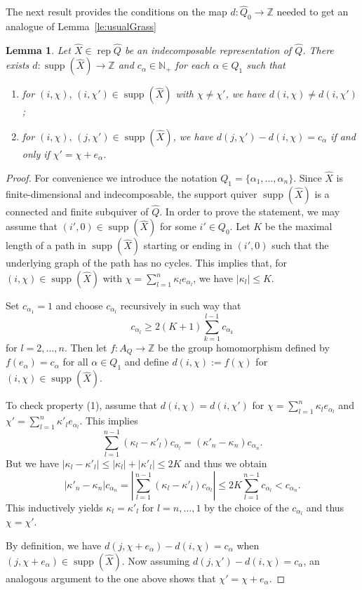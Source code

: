 \documentclass{amsart}
\newtheorem{lemma}[theorem]{Lemma}
\numberwithin{equation}{section}
\newcommand{\ZZ}{\mathbb{Z}}
\newcommand{\rep}{\operatorname{rep}}
\newcommand{\supp}{\operatorname{supp}}
\begin{document}
The next result provides the conditions on the map $d:\hat Q_0\to\ZZ$ needed to get an analogue of Lemma~\ref{le:usualGrass}
\begin{lemma}
  \label{le:degree condition} 
  Let $\hat X\in\rep\hat Q$ be an indecomposable representation of $\hat Q$.
  There exists $d:\supp(\hat X)\to\ZZ$ and $c_\alpha\in\mathbb N_+$ for each $\alpha\in Q_1$ such that
  \begin{enumerate}
    \item for $(i,\chi),\,(i,\chi')\in\supp(\hat X)$ with $\chi\neq\chi'$, we have $d(i,\chi)\ne d(i,\chi')$;
    \item for $(i,\chi),\,(j,\chi')\in\supp(\hat X)$, we have $d(j,\chi')-d(i,\chi)=c_\alpha$ if and only if $\chi'=\chi+e_\alpha$.
  \end{enumerate}
\end{lemma}
\begin{proof}
  For convenience we introduce the notation $Q_1=\{\alpha_1,\ldots,\alpha_n\}$.
  Since $\hat X$ is finite-dimensional and indecomposable, the support quiver $\supp(\hat X)$ is a connected and finite subquiver of $\hat Q$.
  In order to prove the statement, we may assume that $(i',0)\in\supp(\hat X)$ for some $i'\in Q_0$.
  Let $K$ be the maximal length of a path in $\supp(\hat X)$ starting or ending in $(i',0)$ such that the underlying graph of the path has no cycles.
  This implies that, for $(i,\chi)\in\supp(\hat X)$ with $\chi=\sum_{l=1}^n \kappa_l e_{\alpha_l}$, we have $|\kappa_l|\leq K$.

  Set $c_{\alpha_1}=1$ and choose $c_{\alpha_l}$ recursively in such way that 
  \[c_{\alpha_l}\geq 2(K+1)\sum_{k=1}^{l-1} c_{\alpha_k}\]
  for $l=2,\ldots,n$.  
  Then let $f:A_Q\to\ZZ$ be the group homomorphism defined by $f(e_\alpha)=c_\alpha$ for all $\alpha\in Q_1$ and define $d(i,\chi):=f(\chi)$ for $(i,\chi)\in\supp(\hat X)$.

  To check property (1), assume that $d(i,\chi)=d(i,\chi')$ for $\chi=\sum_{l=1}^n \kappa_l e_{\alpha_l}$ and $\chi'=\sum_{l=1}^n \kappa'_l e_{\alpha_l}$.
  This implies
  \[\sum_{l=1}^{n-1}(\kappa_l-\kappa'_l)c_{\alpha_l}=(\kappa'_n-\kappa_n)c_{\alpha_n}.\]
  But we have $|\kappa_l-\kappa'_l|\leq |\kappa_l|+|\kappa'_l|\le 2K$ and thus we obtain 
  \[|\kappa'_n-\kappa_n|c_{\alpha_n}=\left|\sum_{l=1}^{n-1}(\kappa_l-\kappa'_l)c_{\alpha_l}\right|\le 2K\sum_{l=1}^{n-1}c_{\alpha_l} < c_{\alpha_n}.\]
  This inductively yields $\kappa_l=\kappa'_l$ for $l=n,\ldots,1$ by the choice of the $c_{\alpha_l}$ and thus $\chi=\chi'$. 

  By definition, we have $d(j,\chi+e_\alpha)-d(i,\chi)=c_\alpha$ when $(j,\chi+e_\alpha)\in\supp(\hat X)$.
  Now assuming $d(j,\chi')-d(i,\chi)=c_\alpha$, an analogous argument to the one above shows that $\chi'=\chi+e_\alpha$.
\end{proof}
\end{document}
